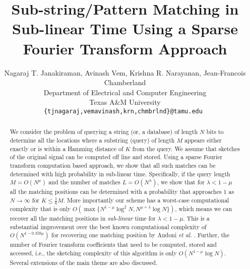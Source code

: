 \documentclass[sigconf]{acmart}
\begin{document}
\title[Sub-string Matching in Sub-linear Time]{Sub-string/Pattern Matching in Sub-linear Time Using a Sparse Fourier Transform Approach}

\author{Nagaraj T. Janakiraman, Avinash Vem, Krishna R. Narayanan, Jean-Francois Chamberland\\
Department of Electrical and Computer Engineering \\
Texas A\&M University\\
{\tt\small {\{tjnagaraj,vemavinash,krn,chmbrlnd\}@tamu.edu} }}

\renewcommand{\shortauthors}{Janakiraman et al.}

\begin{abstract}
	We consider the problem of querying a string (or, a database) of length $N$ bits to determine all the locations where a substring (query) of length $M$ appears either exactly or is within a Hamming distance of $K$ from the query. We assume that sketches of the original signal can be computed off line and stored. Using a sparse Fourier transform computation based approach, we show that all such matches can be determined with high probability in sub-linear time. Specifically, if the query length $M = O(N^\mu)$ and the number of matches $L=O(N^\lambda)$, we show that for $\lambda < 1-\mu$ all the matching positions can be determined with a probability that approaches 1 as $N \rightarrow \infty$ for $K \leq \frac{1}{6}M$. More importantly our scheme has a worst-case computational complexity that is only $O\left(\max\{N^{1-\mu}\log^2 N, N^{\mu+\lambda}\log N \}\right)$, which means we can recover all the matching positions in {\it sub-linear} time for $\lambda<1-\mu$. This is a substantial improvement over the best known computational complexity of $O\left(N^{1-0.359 \mu} \right)$ for recovering one matching position by Andoni {\em et al.} \cite{andoni2013shift}. Further, the number of Fourier transform coefficients that need to be computed, stored and accessed, i.e., the sketching complexity of this algorithm is only $O\left(N^{1-\mu}\log N\right)$. Several extensions of the main theme are also discussed.
\end{abstract}
\end{document}
